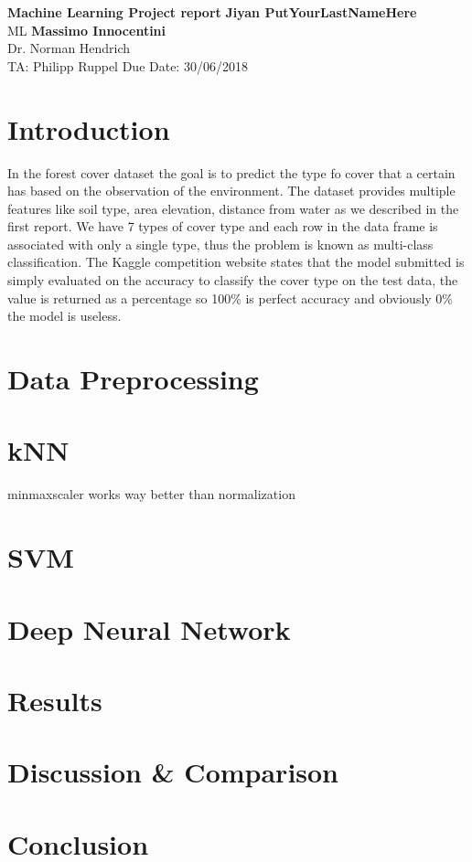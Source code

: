 \documentclass[a4paper, 11pt]{article}
\begin{document}
\noindent
\large\textbf{Machine Learning Project report} \hfill \textbf{Jiyan PutYourLastNameHere} \\
\normalsize ML \hfill \textbf{Massimo Innocentini} \\
Dr. Norman Hendrich \\
TA: Philipp Ruppel \hfill Due Date: 30/06/2018

\section*{Introduction}
In the forest cover dataset the goal is to predict the type fo cover that a certain has based on the observation of the environment. The dataset provides multiple features like soil type, area elevation, distance from water as we described in the first report. We have 7 types of cover type and each row in the data frame is associated with only a single type, thus the problem is known as multi-class classification. The Kaggle competition website states that the model submitted is simply evaluated on the accuracy to classify the cover type on the test data, the value is returned as a percentage so 100\% is perfect accuracy and obviously 0\% the model is useless.

\section*{Data Preprocessing}


\section*{kNN}
minmaxscaler works way better than normalization
\section*{SVM}

\section*{Deep Neural Network}

\section*{Results}

\section*{Discussion \& Comparison}

\section*{Conclusion}

\begin{thebibliography}{9}

\end{thebibliography}
\end{document}
